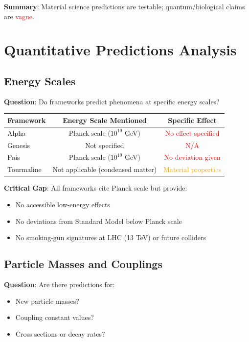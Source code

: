\textbf{Summary}: Material science predictions are \textcolor{validcolor}{testable}; quantum/biological claims are \textcolor{red}{vague}.

\section{Quantitative Predictions Analysis}

\subsection{Energy Scales}

\textbf{Question}: Do frameworks predict phenomena at specific energy scales?

\begin{table}[H]
\centering
\begin{tabular}{lcc}
\toprule
\textbf{Framework} & \textbf{Energy Scale Mentioned} & \textbf{Specific Effect} \\
\midrule
Alpha & Planck scale ($10^{19}$ GeV) & \textcolor{red}{No effect specified} \\
Genesis & Not specified & \textcolor{red}{N/A} \\
Pais & Planck scale ($10^{19}$ GeV) & \textcolor{red}{No deviation given} \\
Tourmaline & Not applicable (condensed matter) & \textcolor{orange}{Material properties} \\
\bottomrule
\end{tabular}
\end{table}

\textbf{Critical Gap}: All frameworks cite Planck scale but provide:
\begin{itemize}
    \item[$-$] No accessible low-energy effects
    \item[$-$] No deviations from Standard Model below Planck scale
    \item[$-$] No smoking-gun signatures at LHC (13 TeV) or future colliders
\end{itemize}

\subsection{Particle Masses and Couplings}

\textbf{Question}: Are there predictions for:
\begin{itemize}
    \item New particle masses?
    \item Coupling constant values?
    \item Cross sections or decay rates?
\end{itemize}

